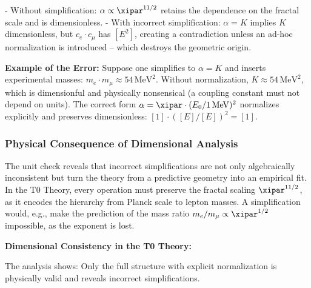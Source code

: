 	- Without simplification: $\alpha \propto \xipar^{11/2}$ retains the dependence on the fractal scale and is dimensionless.
	- With incorrect simplification: $\alpha = K$ implies $K$ dimensionless, but $c_e \cdot c_\mu$ has $[E^2]$, creating a contradiction unless an ad-hoc normalization is introduced – which destroys the geometric origin.
	
	\textbf{Example of the Error:} Suppose one simplifies to $\alpha = K$ and inserts experimental masses: $m_e \cdot m_\mu \approx 54\,\text{MeV}^2$. Without normalization, $K \approx 54\,\text{MeV}^2$, which is dimensionful and physically nonsensical (a coupling constant must not depend on units). The correct form $\alpha = \xipar \cdot (E_0 / 1\,\text{MeV})^2$ normalizes explicitly and preserves dimensionless: $[1] \cdot ([E]/[E])^2 = [1]$.
	
	\subsubsection{Physical Consequence of Dimensional Analysis}
	
	The unit check reveals that incorrect simplifications are not only algebraically inconsistent but turn the theory from a predictive geometry into an empirical fit. In the T0 Theory, every operation must preserve the fractal scaling $\xipar^{11/2}$, as it encodes the hierarchy from Planck scale to lepton masses. A simplification would, e.g., make the prediction of the mass ratio $m_e/m_\mu \propto \xipar^{1/2}$ impossible, as the exponent is lost.
	
	\begin{foundation}
		\textbf{Dimensional Consistency in the T0 Theory:}
		\begin{center}
		\end{center}
		
		The analysis shows: Only the full structure with explicit normalization is physically valid and reveals incorrect simplifications.
	\end{foundation}
	
